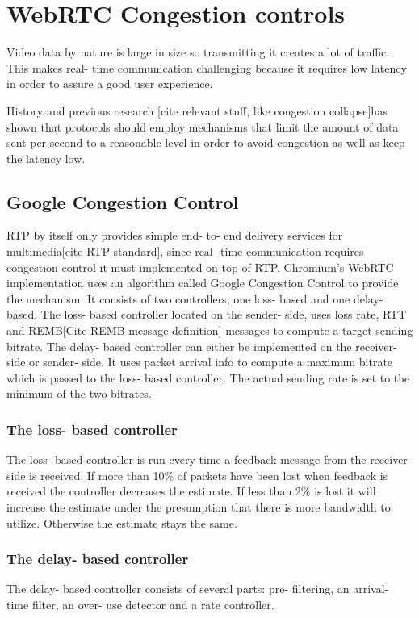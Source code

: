 \section{WebRTC Congestion controls}
Video data by nature is large in size so transmitting it creates a lot of traffic. 
This makes real- time communication challenging because it requires low latency in order to assure a good user experience. 

History and previous research [cite relevant stuff, like congestion collapse]has shown that protocols should employ mechanisms that limit the amount of data sent per second to a reasonable level in order to avoid congestion as well as keep the latency low.
\subsection{Google Congestion Control}
RTP by itself only provides simple end- to- end delivery services for multimedia[cite RTP standard], since real- time communication requires congestion control it must implemented on top of RTP. 
Chromium's WebRTC implementation uses an algorithm called Google Congestion Control \cite{draft-ietf-rmcat-gcc} to provide the mechanism.
It consists of two controllers, one loss- based and one delay- based. 
The loss- based controller located on the sender- side, uses loss rate, RTT and REMB[Cite REMB message definition] messages to compute a target sending bitrate. 
The delay- based controller can either be implemented on the receiver- side or sender- side.
It uses packet arrival info to compute a maximum bitrate which is passed to the loss- based controller. The actual sending rate is set to the minimum of the two bitrates.
\subsubsection{The loss- based controller}
The loss- based controller is run every time a feedback message from the receiver- side is received. 
If more than 10\% of packets have been lost when feedback is received the controller decreases the estimate. 
If less than 2\% is lost it will increase the estimate under the presumption that there is more bandwidth to utilize. 
Otherwise the estimate stays the same.
\subsubsection{The delay- based controller}
 The delay- based controller consists of several parts: pre- filtering, an arrival- time filter, an over- use detector and a rate controller. %

